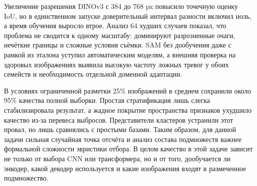 \documentclass[a4paper,12pt]{extarticle}
\begin{document}
Увеличение разрешения DINOv3 с 384 до 768 px повысило точечную оценку IoU, но
в единственном запуске доверительный интервал разности включил ноль, а время
обучения выросло втрое. Анализ 64 худших случаев показал, что проблема не
сводится к одному масштабу: доминируют
разрозненные очаги, нечёткие границы и сложные условия съёмки. SAM без дообучения
даже с рамкой из эталона уступил автоматическим моделям, а внешняя проверка на
здоровых изображениях выявила высокую частоту ложных тревог у обоих семейств и
необходимость отдельной доменной адаптации.

В условиях ограниченной разметки 25\% изображений в среднем сохранили около
95\% качества полной выборки. Простая стратификация лишь слегка стабилизировала
результат, а жадное покрытие пространства признаков ухудшило качество из-за
перевеса выбросов. Представители кластеров устранили этот провал, но лишь
сравнялись с простыми базами. Таким образом, для данной задачи сильная случайная
точка отсчёта и анализ состава подмножеств важнее формальной сложности
эвристики отбора. В целом качество в этой задаче зависит не только от выбора CNN
или трансформера, но и от того, дообучается ли энкодер, какой декодер используется
и какие изображения входят в размеченное подмножество.

\begingroup
\sloppy
\printbibliography[heading=bibintoc,title={Список использованных источников}]
\endgroup
\end{document}

